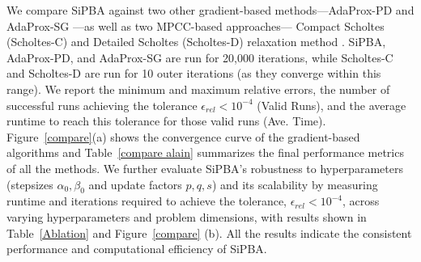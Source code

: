 \documentclass{article}
\begin{document}
\begin{table}[htbp]
    \vspace{-1.5em}
    \centering
    \caption{Performance comparison of the SiPBA, AdaProx-PD, AdaProx-SG, Scholtes-C, and Scholtes-D with $n=100$. }
    \label{compare alain}
    \vspace{-0.5em}
\end{table}     
  
We compare SiPBA against two other gradient-based methods—AdaProx-PD and AdaProx-SG \cite{guanadaprox}—as well as two MPCC-based approaches— Compact Scholtes (Scholtes-C) and Detailed Scholtes (Scholtes-D) relaxation method \cite{benchouk2025scholtes}. SiPBA, AdaProx-PD, and AdaProx-SG are run for 20,000 iterations, while  Scholtes-C and Scholtes-D are run for 10 outer iterations (as they converge within this range).  We report the minimum and maximum relative errors, the number of successful runs achieving the tolerance $\epsilon_{rel} < 10^{-4}$ (Valid Runs), and the average runtime to reach this tolerance for those valid runs (Ave. Time). Figure~\ref{compare}(a) shows the convergence curve of the gradient-based algorithms and Table~\ref{compare alain} summarizes the final performance metrics of all the methods. We further evaluate SiPBA’s robustness to hyperparameters (stepsizes $\alpha_0,\beta_0$ and update factors $p,q,s$) and its scalability by measuring runtime and iterations required to achieve the tolerance, $\epsilon_{rel} < 10^{-4}$, across varying hyperparameters and problem dimensions, with results shown in Table~\ref{Ablation} and Figure~\ref{compare} (b). All the results indicate the consistent performance and computational efficiency of SiPBA.
\end{document}
